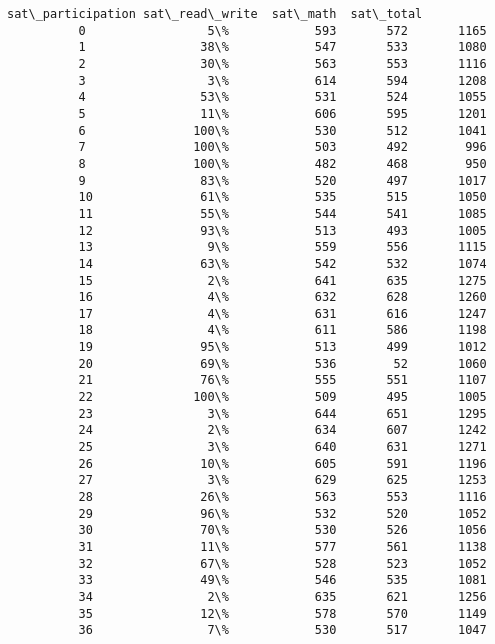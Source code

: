 \documentclass[11pt]{article}
\begin{document}
\begin{Verbatim}[commandchars=\\\{\}]
             sat\_participation sat\_read\_write  sat\_math  sat\_total  
          0                 5\%            593       572       1165  
          1                38\%            547       533       1080  
          2                30\%            563       553       1116  
          3                 3\%            614       594       1208  
          4                53\%            531       524       1055  
          5                11\%            606       595       1201  
          6               100\%            530       512       1041  
          7               100\%            503       492        996  
          8               100\%            482       468        950  
          9                83\%            520       497       1017  
          10               61\%            535       515       1050  
          11               55\%            544       541       1085  
          12               93\%            513       493       1005  
          13                9\%            559       556       1115  
          14               63\%            542       532       1074  
          15                2\%            641       635       1275  
          16                4\%            632       628       1260  
          17                4\%            631       616       1247  
          18                4\%            611       586       1198  
          19               95\%            513       499       1012  
          20               69\%            536        52       1060  
          21               76\%            555       551       1107  
          22              100\%            509       495       1005  
          23                3\%            644       651       1295  
          24                2\%            634       607       1242  
          25                3\%            640       631       1271  
          26               10\%            605       591       1196  
          27                3\%            629       625       1253  
          28               26\%            563       553       1116  
          29               96\%            532       520       1052  
          30               70\%            530       526       1056  
          31               11\%            577       561       1138  
          32               67\%            528       523       1052  
          33               49\%            546       535       1081  
          34                2\%            635       621       1256  
          35               12\%            578       570       1149  
          36                7\%            530       517       1047  

\end{Verbatim}
\end{document}

